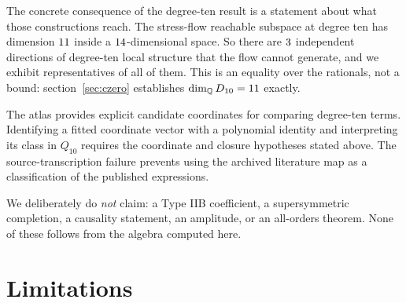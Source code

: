 \documentclass[11pt,a4paper]{article}
\begin{document}
The concrete consequence of the degree-ten result is a statement about what those
constructions reach. The stress-flow reachable subspace at degree ten has
dimension $11$ inside a $14$-dimensional space. So there are
$3$ independent directions of degree-ten local structure that the flow
cannot generate, and we exhibit representatives of all of them. This is an
equality over the rationals, not a bound: section~\ref{sec:czero} establishes
$\dim_{\mathbb{Q}} D_{10} = 11$ exactly.

The atlas provides explicit candidate coordinates for comparing degree-ten
terms. Identifying a fitted coordinate vector with a polynomial identity and
interpreting its class in $Q_{10}$ requires the coordinate and closure
hypotheses stated above. The source-transcription failure prevents using the
archived literature map as a classification of the published expressions.

We deliberately do \emph{not} claim: a Type IIB coefficient, a supersymmetric
completion, a causality statement, an amplitude, or an all-orders theorem. None
of these follows from the algebra computed here.

\section{Limitations}
\label{sec:limitations}
\end{document}
